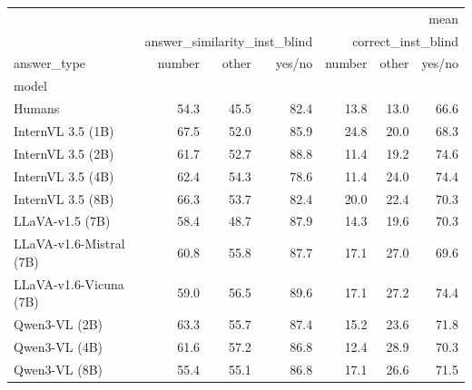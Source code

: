 \begin{tabular}{lrrrrrr}
\toprule
 & \multicolumn{6}{r}{mean} \\
 & \multicolumn{3}{r}{answer_similarity_inst_blind} & \multicolumn{3}{r}{correct_inst_blind} \\
answer_type & number & other & yes/no & number & other & yes/no \\
model &  &  &  &  &  &  \\
\midrule
Humans & 54.3 & 45.5 & 82.4 & 13.8 & 13.0 & 66.6 \\
InternVL 3.5 (1B) & 67.5 & 52.0 & 85.9 & 24.8 & 20.0 & 68.3 \\
InternVL 3.5 (2B) & 61.7 & 52.7 & 88.8 & 11.4 & 19.2 & 74.6 \\
InternVL 3.5 (4B) & 62.4 & 54.3 & 78.6 & 11.4 & 24.0 & 74.4 \\
InternVL 3.5 (8B) & 66.3 & 53.7 & 82.4 & 20.0 & 22.4 & 70.3 \\
LLaVA-v1.5 (7B) & 58.4 & 48.7 & 87.9 & 14.3 & 19.6 & 70.3 \\
LLaVA-v1.6-Mistral (7B) & 60.8 & 55.8 & 87.7 & 17.1 & 27.0 & 69.6 \\
LLaVA-v1.6-Vicuna (7B) & 59.0 & 56.5 & 89.6 & 17.1 & 27.2 & 74.4 \\
Qwen3-VL (2B) & 63.3 & 55.7 & 87.4 & 15.2 & 23.6 & 71.8 \\
Qwen3-VL (4B) & 61.6 & 57.2 & 86.8 & 12.4 & 28.9 & 70.3 \\
Qwen3-VL (8B) & 55.4 & 55.1 & 86.8 & 17.1 & 26.6 & 71.5 \\
\bottomrule
\end{tabular}
